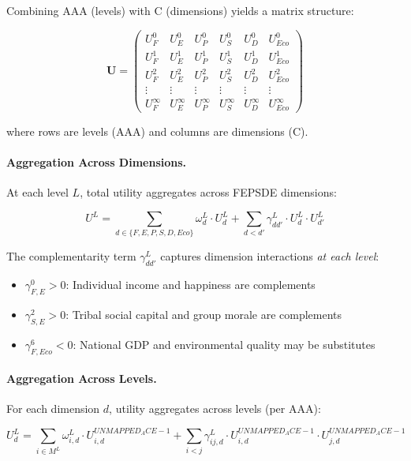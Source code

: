 Combining AAA (levels) with C (dimensions) yields a matrix structure:

\begin{equation}
\mathbf{U} = \begin{pmatrix}
U^0_F & U^0_E & U^0_P & U^0_S & U^0_D & U^0_{Eco} \\
U^1_F & U^1_E & U^1_P & U^1_S & U^1_D & U^1_{Eco} \\
U^2_F & U^2_E & U^2_P & U^2_S & U^2_D & U^2_{Eco} \\
\vdots & \vdots & \vdots & \vdots & \vdots & \vdots \\
U^{\infty}_F & U^{\infty}_E & U^{\infty}_P & U^{\infty}_S & U^{\infty}_D & U^{\infty}_{Eco}
\end{pmatrix}
\end{equation}

where rows are levels (AAA) and columns are dimensions (C).

\paragraph{Aggregation Across Dimensions.}

At each level $L$, total utility aggregates across FEPSDE dimensions:

\begin{equation}
U^L = \sum_{d \in \{F, E, P, S, D, Eco\}} \omega^L_d \cdot U^L_d + \sum_{d < d'} \gamma^L_{dd'} \cdot U^L_d \cdot U^L_{d'}
\end{equation}

The complementarity term $\gamma^L_{dd'}$ captures dimension interactions \textit{at each level}:
\begin{itemize}[nosep]
\item $\gamma^0_{F,E} > 0$: Individual income and happiness are complements
\item $\gamma^2_{S,E} > 0$: Tribal social capital and group morale are complements
\item $\gamma^6_{F,Eco} < 0$: National GDP and environmental quality may be substitutes
\end{itemize}

\paragraph{Aggregation Across Levels.}

For each dimension $d$, utility aggregates across levels (per AAA):

\begin{equation}
U^L_d = \sum_{i \in M^L} \omega^L_{i,d} \cdot U^{UNMAPPED_ACE-1}_{i,d} + \sum_{i < j} \gamma^L_{ij,d} \cdot U^{UNMAPPED_ACE-1}_{i,d} \cdot U^{UNMAPPED_ACE-1}_{j,d}
\end{equation}

